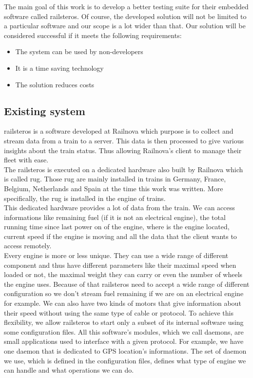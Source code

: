 \documentclass[12pt]{article}
\begin{document}
The main goal of this work is to develop a better testing suite for their embedded software called \gls{railsteros}. Of course, the developed solution will not be limited to a particular software and our scope is a lot wider than that. Our solution will be considered successful if it meets the following requirements:

\begin{itemize}
\item The system can be used by non-developers
\item It is a time saving technology
\item The solution reduces costs
\end{itemize}

\subsection{Existing system}

\gls{railsteros} is a software developed at Railnova which purpose is to collect and stream data from a train to a server. This data is then processed to give various insights about the train status. Thus allowing Railnova's client to manage their fleet with ease.\\

The \gls{railsteros} is executed on a dedicated hardware also built by Railnova which is called \gls{rug}. Those \gls{rug} are mainly installed in trains in Germany, France, Belgium, Netherlands and Spain at the time this work was written. More specifically, the \gls{rug} is installed in the engine of trains.\\

This dedicated hardware provides a lot of data from the train. We can access informations like remaining fuel (if it is not an electrical engine), the total running time since last power on of the engine, where is the engine located, current speed if the engine is moving and all the data that the client wants to access remotely.\\

Every engine is more or less unique. They can use a wide range of different component and thus have different parameters like their maximal speed when loaded or not, the maximal weight they can carry or even the number of wheels the engine uses. Because of that \gls{railsteros} need to accept a wide range of different configuration so we don't stream fuel remaining if we are on an electrical engine for example. We can also have two kinds of motors that give information about their speed without using the same type of cable or protocol. To achieve this flexibility, we allow \gls{railsteros} to start only a subset of its internal software using some configuration files. All this software's modules, which we call \gls{daemons}, are small applications used to interface with a given protocol. For example, we have one daemon that is dedicated to GPS location's informations. The set of daemon we use, which is defined in the configuration files, defines what type of engine we can handle and what operations we can do.\\
\end{document}
